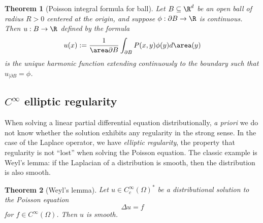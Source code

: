 \documentclass[reqno]{amsart}
\newtheorem{theorem}{Theorem}
\theoremstyle{definition}
\theoremstyle{remark}
\begin{document}
\begin{theorem}[Poisson integral formula for ball]
	Let $B \subseteq \R^d$ be an open ball of radius $R > 0$ centered at the origin, and suppose $\phi : \partial B \to \R$ is continuous. Then $u : B \to \R$ defined by the formula
		\[ u(x) := \frac{1}{\area \partial B} \int_{\partial B} P(x, y) \phi(y) d \area (y) \]
	is the unique harmonic function extending continuously to the boundary such that $u_{|\partial B} = \phi$. 
\end{theorem}

\subsection{$C^\infty$ elliptic regularity}

When solving a linear partial differential equation distributionally, \textit{a priori} we do not know whether the solution exhibits any regularity in the strong sense. In the case of the Laplace operator, we have \textit{elliptic regularity}, the property that regularity is not ``lost'' when solving the Poisson equation. The classic example is Weyl's lemma: if the Laplacian of a distribution is smooth, then the distribution is also smooth.

\begin{theorem}[Weyl's lemma]
	Let $u \in C^\infty_c (\Omega)^*$ be a distributional solution to the Poisson equation 
		\[ \Delta u = f\]
	for $f \in C^\infty (\Omega)$. Then $u$ is smooth. 
\end{theorem}
\end{document}
